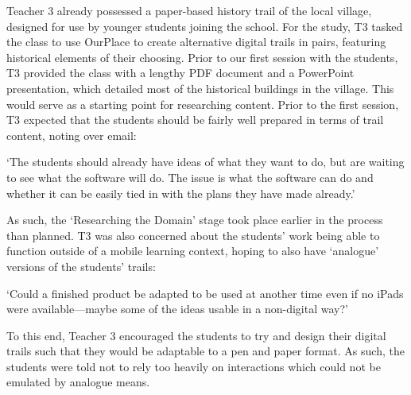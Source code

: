 Teacher 3 already possessed a paper-based history trail of the local village, designed for use by younger students joining the school. For the study, T3 tasked the class to use OurPlace to create alternative digital trails in pairs, featuring historical elements of their choosing. Prior to our first session with the students, T3 provided the class with a lengthy PDF document and a PowerPoint presentation, which detailed most of the historical buildings in the village. This would serve as a starting point for researching content. Prior to the first session, T3 expected that the students should be fairly well prepared in terms of trail content, noting over email: 

\begin{displayquote}
`The students should already have ideas of what they want to do, but are waiting to see what the software will do. The issue is what the software can do and whether it can be easily tied in with the plans they have made already.'
\end{displayquote}

As such, the `Researching the Domain' stage took place earlier in the process than planned. T3 was also concerned about the students' work being able to function outside of a mobile learning context, hoping to also have `analogue' versions of the students' trails: 

\begin{displayquote}
`Could a finished product be adapted to be used at another time even if no iPads were available---maybe some of the ideas usable in a non-digital way?'
\end{displayquote}

To this end, Teacher 3 encouraged the students to try and design their digital trails such that they would be adaptable to a pen and paper format. As such, the students were told not to rely too heavily on interactions which could not be emulated by analogue means.

